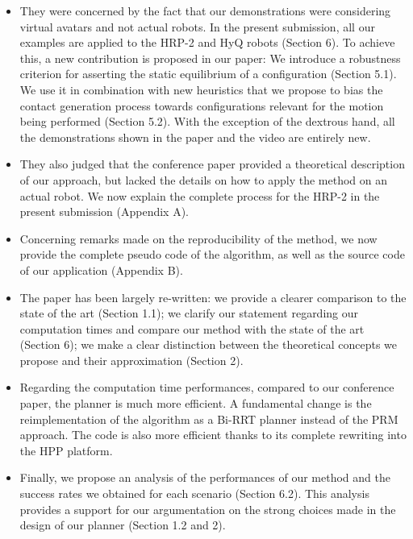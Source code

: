 \documentclass[a4paper]{article}
\begin{document}
\begin{itemize}
\item They were concerned by the fact that our demonstrations were
considering virtual avatars and not actual robots. In the present
submission, all our examples are applied to the HRP-2 and HyQ robots (Section 6).
To achieve this, a new contribution is proposed in our paper:
We introduce a robustness criterion for asserting the static equilibrium
of a configuration (Section 5.1). We use it in combination with new heuristics that we
propose to bias the contact generation process towards configurations
relevant for the motion being performed (Section 5.2).
With the exception of the dextrous hand, all the demonstrations shown in
the paper and the video are entirely new.

\item They also judged that the conference paper provided a theoretical
description of our approach, but lacked the details on how to apply
the method on an actual robot. We now explain the complete process
for the HRP-2 in the present submission (Appendix A).

\item Concerning remarks made on the reproducibility of the method,
we now provide the complete pseudo code of the algorithm, as well as the
source code of our application (Appendix B).

\item The paper has been largely re-written: we provide a clearer
comparison to the state of the art (Section 1.1); we clarify our statement regarding
our computation times and compare our method with the state of the art (Section 6); we make a clear distinction between the
theoretical concepts we propose and their approximation (Section 2).

\item Regarding the computation time performances, compared to our conference paper, the planner is much more efficient.
A fundamental change is the reimplementation of the algorithm as a Bi-RRT planner instead of the PRM
approach. The code is also more efficient thanks to its complete rewriting into the HPP platform.

\item Finally, we propose an analysis of the performances of our method and
the success rates we obtained for each scenario (Section 6.2). This analysis provides
a support for our argumentation on the strong choices made in the design
of our planner (Section 1.2 and 2).
\end{itemize}
\end{document}
